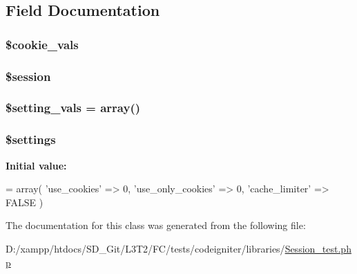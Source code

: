 \subsection{Field Documentation}
\hypertarget{class_session__test_a36ea48aaa06330d182a738b99354865a}{}
\subsubsection[{\$cookie\+\_\+vals}]{\setlength{\rightskip}{0pt plus 5cm}\$cookie\+\_\+vals\hspace{0.3cm}{\ttfamily [protected]}}\label{class_session__test_a36ea48aaa06330d182a738b99354865a}
\hypertarget{class_session__test_abefb3c26429d514777313e9a63d7cbac}{}
\subsubsection[{\$session}]{\setlength{\rightskip}{0pt plus 5cm}\$session\hspace{0.3cm}{\ttfamily [protected]}}\label{class_session__test_abefb3c26429d514777313e9a63d7cbac}
\hypertarget{class_session__test_abe91b52072ee4aae659bc203caad5e20}{}
\subsubsection[{\$setting\+\_\+vals}]{\setlength{\rightskip}{0pt plus 5cm}\$setting\+\_\+vals = array()\hspace{0.3cm}{\ttfamily [protected]}}\label{class_session__test_abe91b52072ee4aae659bc203caad5e20}
\hypertarget{class_session__test_ac7c3353107070daa85f641882931b358}{}
\subsubsection[{\$settings}]{\setlength{\rightskip}{0pt plus 5cm}\$settings\hspace{0.3cm}{\ttfamily [protected]}}\label{class_session__test_ac7c3353107070daa85f641882931b358}
{\bfseries Initial value\+:}
\begin{DoxyCode}
= array(
        \textcolor{stringliteral}{'use\_cookies'} => 0,
        \textcolor{stringliteral}{'use\_only\_cookies'} => 0,
        \textcolor{stringliteral}{'cache\_limiter'} => FALSE
    )
\end{DoxyCode}


The documentation for this class was generated from the following file\+:\begin{DoxyCompactItemize}
\item 
D\+:/xampp/htdocs/\+S\+D\+\_\+\+Git/\+L3\+T2/\+F\+C/tests/codeigniter/libraries/\hyperlink{_session__test_8php}{Session\+\_\+test.\+php}\end{DoxyCompactItemize}

